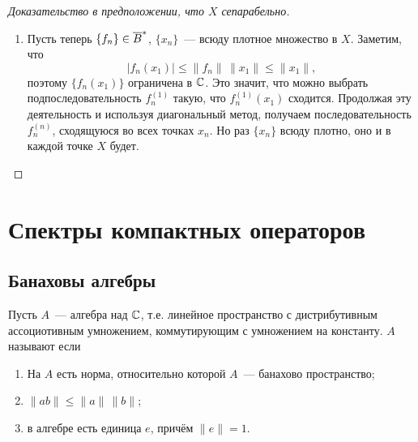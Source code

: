 \documentclass{notes}
\newcommand{\ssph}{\ov{B}^*}
\begin{document}
\begin{thm}
\begin{proof}[Доказательство в предположении, что $X$ сепарабельно]
\begin{enumerate}
				Поскольку множество $\{x_n\}$ плотное, для каждого $y_k$ найдётся $x_{i_k}$ такой, что
				\[
					\|y_k - x_{i_k}\| < \dfrac{\varepsilon}{3\big(1 + \|f_0\|\big)}.
				\]
				Положим $\delta = \tfrac{\varepsilon}{3}$ и рассмотрим $f \in U_{\delta} \cap \ssph$. Проверим, лежит ли $f$ в $V_{\varepsilon}$:
				\begin{align*}
					\big|f(y_k) - f_0(y_k)\big| &= \big|f(y_k) - f(x_{i_k}) + f(x_{i_k}) - f_0(x_{i_k}) + f_0(x_{i_k}) - f_0(y_k)\big| \leqslant \\ 
					&\leqslant \big|f(y_k) - f(x_{i_k})\big| + \big|f(x_{i_k}) - f_0(x_{i_k})\big| + \big|f_0(x_{i_k}) - f_0(y_k)\big| \leqslant \\
					&\leqslant \underbrace{\|f\| \, \|y_k - x_{i_k}\|}_{<\dfrac{\varepsilon}{3\big(1 + \|f_0\|\big)}} + \underbrace{\big|f(x_{i_k}) - f_0(x_{i_k})\big|}_{\leqslant\dfrac{\varepsilon}{3}} + \|f_0\| \, \underbrace{\|x_{i_k} - y_k\|}_{\mathclap{<\dfrac{\varepsilon}{3\big(1 + \|f_0\|\big)}}} < \varepsilon.
				\end{align*}
				Успех!
				\item Пусть теперь $\{f_n\} \in \ssph$, $\{x_n\}$~--- всюду плотное множество в $X$. Заметим, что
				\[
					\big|f_n(x_1)\big| \leqslant \|f_n\| \, \|x_1\| \leqslant \|x_1\|,
				\]
				поэтому $\big\{f_n(x_1)\big\}$ ограничена в $\mathbb{C}$. Это значит, что можно выбрать подпоследовательность $f_n^{(1)}$ такую, что $f_n^{(1)}(x_1)$ сходится. Продолжая эту деятельность и используя диагональный метод, получаем последовательность $f_n^{(n)}$, сходящуюся во всех точках $x_n$. Но раз $\{x_n\}$ всюду плотно, оно и в каждой точке $X$ будет.
			\end{enumerate}
		\end{proof}
	\end{thm}

	\chapter{Спектры компактных операторов}

	\setcounter{section}{19}

\section{Банаховы алгебры}

	\begin{de}
		Пусть $A$~--- алгебра над $\mathbb{C}$, т.е. линейное пространство с дистрибутивным ассоциотивным умножением, коммутирующим с умножением на константу. $A$ называют  если 
		\begin{enumerate}
			\item На $A$ есть норма, относительно которой $A$~--- банахово пространство;
			\item $\|ab\| \leqslant \|a\|\,\|b\|$;
			\item в алгебре есть единица $e$, причём $\|e\| = 1$.
		\end{enumerate}
	\end{de}
\end{document}
